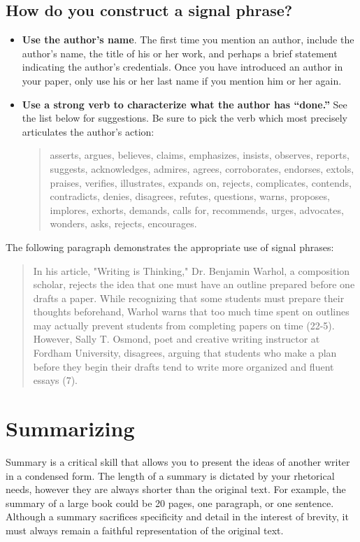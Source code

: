 \subsection{How do you construct a signal phrase?}
 
\begin{itemize}
\item \textbf{Use the author's name}. The first time you mention an author, include the 
author's name, the title of his or her work, and perhaps a brief statement indicating the 
author's credentials. Once you have introduced an author in your paper, only use his or 
her last name if you mention him or her again.

\item \textbf{Use a strong verb to characterize what the author has “done.”} See the list 
below for suggestions. Be sure to pick the verb which most precisely articulates the 
author's action:

\begin{quote}
asserts, argues, believes, claims, emphasizes, insists, observes, reports, 
suggests, acknowledges, admires, agrees, corroborates, endorses, extols, praises, 
verifies, illustrates, expands on, rejects, complicates, contends, contradicts, denies, 
disagrees, refutes, questions, warns, proposes, implores, exhorts, demands, calls for, 
recommends, urges, advocates, wonders, asks, rejects, encourages.
\end{quote}

\end{itemize}
 
The following paragraph demonstrates the appropriate use of signal phrases:
 
 \begin{quote}
In his article, "Writing is Thinking," Dr. Benjamin Warhol, a composition scholar, rejects 
the idea that one must have an outline prepared before one drafts a paper. While 
recognizing that some students must prepare their thoughts beforehand, Warhol warns 
that too much time spent on outlines may actually prevent students from completing 
papers on time (22-5). However, Sally T. Osmond, poet and  creative writing instructor at 
Fordham University, disagrees, arguing that students who make a plan before they 
begin their drafts tend to write more organized and fluent essays (7). \end{quote}

\section{Summarizing}
Summary is a critical skill that allows you to present the ideas of another writer in a condensed form. 
The length of a summary is dictated by your rhetorical needs, however they are always shorter than 
the original text. For example, the summary of a large book could be 20 pages, one paragraph, or one 
sentence. Although a summary sacrifices specificity and detail in the interest of brevity, it must always 
remain a faithful representation of the original text.


